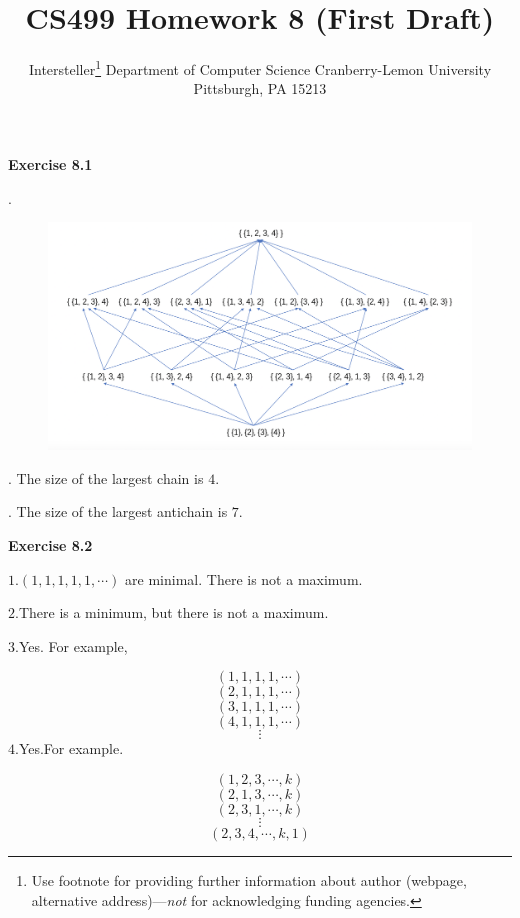 \documentclass{article} %
\title{CS499 Homework 8 (First Draft)}
\author{
	Intersteller\thanks{ Use footnote for providing further information
		about author (webpage, alternative address)---\emph{not} for acknowledging
		funding agencies.}
	Department of Computer Science
	Cranberry-Lemon University
	Pittsburgh, PA 15213
}
\begin{document}
	\maketitle
	\textbf{Exercise 8.1}\par
	.\par
  	\begin{figure}[H]
  	\centering
  	\includegraphics[scale=0.5]{8_1.png}
  	\caption{}
  	\label{}
  	\end{figure}
	. The size of the largest chain is $4$.\par
	 . The size of the largest antichain is $7$.\par 

\textbf{Exercise 8.2}\par
    $1.(1,1,1,1,1,\cdots)$ are minimal. There is not a maximum.\par
    $2.$There is a minimum, but there is not a maximum.\par
    $3.$Yes. For example,\par
    $$(1,1,1,1,\cdots)$$
    $$(2,1,1,1,\cdots)$$
    $$(3,1,1,1,\cdots)$$
    $$(4,1,1,1,\cdots)$$
    $$\vdots$$
    $4.$Yes.For example.\par
    $$(1,2,3,\cdots,k)$$
    $$(2,1,3,\cdots,k)$$
    $$(2,3,1,\cdots,k)$$
    $$\vdots$$
    $$(2,3,4,\cdots,k,1)$$
\end{document}
